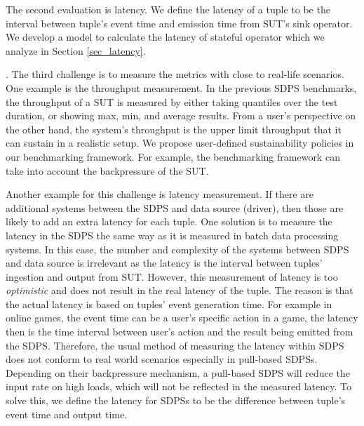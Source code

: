 
  
The second evaluation is latency. We define the latency of a tuple to be the interval between tuple's event time and emission time from SUT's sink operator. We develop a model to calculate the latency of stateful operator  which we analyze in Section \ref{sec_latency}.

.
The third challenge is to measure the metrics with close to real-life scenarios. %
One example  is the throughput measurement. In the previous SDPS benchmarks, the throughput of a SUT is measured by either taking quantiles over the test duration, or showing max, min, and average results. 
From a user's perspective on the other hand, the system's throughput is the upper limit throughput that it can sustain in a realistic setup. 
We propose user-defined sustainability policies in our benchmarking framework. For example, the benchmarking framework can take into account the backpressure of  the SUT.  %



Another example for this challenge is latency measurement. If there are additional systems between the SDPS and data source (driver), then those are likely to add an extra latency for each tuple.  One solution is  to measure the latency in the SDPS the same way as it is measured in batch data processing systems. In this case, the number and complexity of the systems between SDPS and data source is irrelevant as the latency is the interval between tuples' ingestion and output from SUT. However, this measurement of latency is too \textit{optimistic} and does not result in the real latency of the tuple. The reason is that  the actual latency is based on tuples' event generation time. For example in online games, the event time can be a user's specific action in a game, the latency then is the time interval between user's action and the result being emitted from the SDPS. Therefore, the usual method of measuring the latency within SDPS does not conform to real world scenarios especially in pull-based SDPSs. Depending on their backpressure mechanism, a pull-based SDPS will reduce the input rate on high loads, which will not be reflected in the measured latency. To solve this, we define the latency for SDPSs to be the difference between tuple's event time and output time. 

